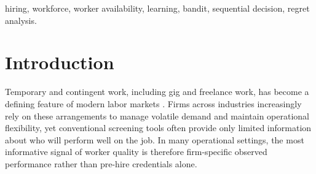 \documentclass[opre,blindrev]{informs3}
\begin{document}
{\vspace{.15in}


 hiring, workforce, worker availability, learning, bandit, sequential decision, regret analysis. 
}%


\maketitle


%

\section{Introduction}
Temporary and contingent work, including gig and freelance work, has become a defining feature of modern labor markets \citep{wood2019good, wu2024gig}. Firms across industries increasingly rely on these arrangements to manage volatile demand and maintain operational flexibility, yet conventional screening tools often provide only limited information about who will perform well on the job. In many operational settings, the most informative signal of worker quality is therefore firm-specific observed performance rather than pre-hire credentials alone.
\end{document}
